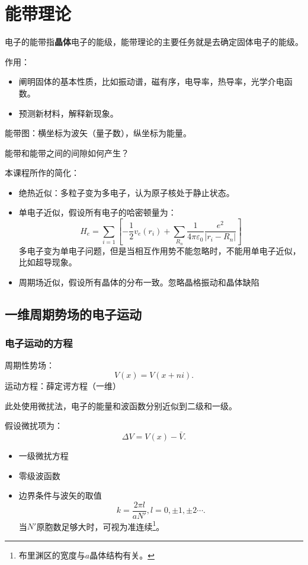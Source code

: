 \chapter{能带理论}
\begin{define}
    电子的能带指\textbf{晶体}电子的能级，能带理论的主要任务就是去确定固体电子的能级。
\end{define}
作用：
\begin{itemize}
    \item 阐明固体的基本性质，比如振动谱，磁有序，电导率，热导率，光学介电函数。
    \item 预测新材料，解释新现象。
\end{itemize}
能带图：横坐标为波矢（量子数），纵坐标为能量。

能带和能带之间的间隙如何产生？

本课程所作的简化：
\begin{itemize}
    \item 绝热近似：多粒子变为多电子，认为原子核处于静止状态。
    \item 单电子近似，假设所有电子的哈密顿量为：
    \begin{equation}
        H_e=\sum_{i=1}\left[-\frac{1}{2}v_e(r_i)+\sum_{R_n}\frac{1}{4\pi\varepsilon_0}\frac{e^2}{|r_i-R_n|}\right]
    \end{equation}
    多电子变为单电子问题，但是当相互作用势不能忽略时，不能用单电子近似，比如超导现象。
    \item  周期场近似，假设所有晶体的分布一致。忽略晶格振动和晶体缺陷
\end{itemize}

\section{一维周期势场的电子运动}
\subsection{电子运动的方程}
周期性势场：
\begin{equation}
    V(x)=V(x+ni).
\end{equation}
运动方程：薛定谔方程（一维）

此处使用微扰法，电子的能量和波函数分别近似到二级和一级。

假设微扰项为：
\begin{equation}
    \Delta V=V(x)-\bar{V}.
\end{equation}
\begin{itemize}
    \item 一级微扰方程
    \item 零级波函数
    \item 边界条件与波矢的取值
    \begin{equation}
        k=\frac{2\pi l}{aN'}, l=0,\pm 1,\pm 2\cdots .
    \end{equation}
    当$N'$原胞数足够大时，可视为准连续\footnote{布里渊区的宽度与$a$晶体结构有关。}。
\end{itemize}

